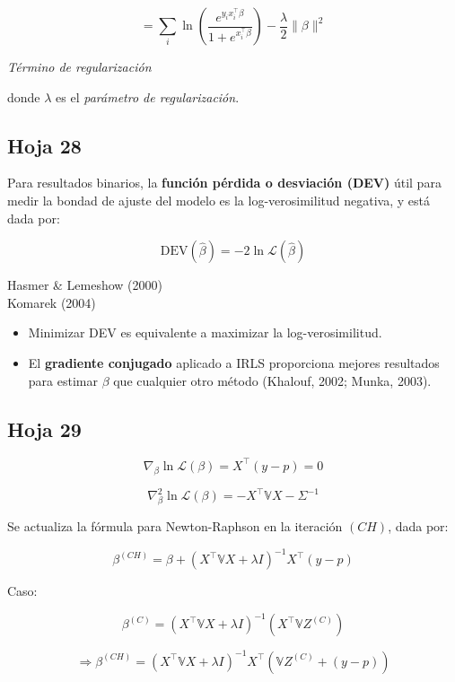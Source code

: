 \documentclass[12pt]{article}
\begin{document}
\[
= \sum_i \ln \left( \frac{e^{y_i x_i^\top \beta}}{1 + e^{x_i^\top \beta}} \right) - \frac{\lambda}{2} \| \beta \|^2
\]

\hfill \textit{Término de regularización}

\medskip

\noindent donde \( \lambda \) es el \textit{parámetro de regularización}.

\subsection{Hoja 28}

Para resultados binarios, la \textbf{función pérdida o desviación (DEV)} útil para medir la bondad de ajuste del modelo es la log-verosimilitud negativa, y está dada por:

\[
\mathrm{DEV}(\hat{\beta}) = -2 \ln \mathcal{L}(\hat{\beta})
\]

\begin{flushright}
Hasmer \& Lemeshow (2000)\\
Komarek (2004)
\end{flushright}

\begin{itemize}
    \item Minimizar DEV es equivalente a maximizar la log-verosimilitud.
    \item El \textbf{gradiente conjugado} aplicado a IRLS proporciona mejores resultados para estimar \( \beta \) que cualquier otro método (Khalouf, 2002; Munka, 2003).
\end{itemize}


\subsection{Hoja 29}


\[
\nabla_\beta \ln \mathcal{L}(\beta) = X^\top (y - p) = 0
\]

\[
\nabla_\beta^2 \ln \mathcal{L}(\beta) = -X^\top \mathbb{V} X - \Sigma^{-1}
\]

Se actualiza la fórmula para Newton-Raphson en la iteración \( (CH) \), dada por:

\[
\beta^{(CH)} = \beta + \left( X^\top \mathbb{V} X + \lambda I \right)^{-1} X^\top \left( y - p \right)
\]

Caso:

\[
\beta^{(C)} = \left( X^\top \mathbb{V} X + \lambda I \right)^{-1} \left( X^\top \mathbb{V} Z^{(C)} \right)
\]

\[
\Rightarrow \beta^{(CH)} = \left( X^\top \mathbb{V} X + \lambda I \right)^{-1} X^\top \left( \mathbb{V} Z^{(C)} + (y - p) \right)
\]
\end{document}

